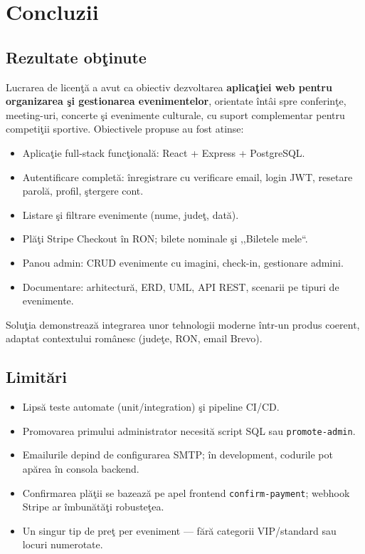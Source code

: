 \chapter{Concluzii}

\section{Rezultate ob\c tinute}

Lucrarea de licen\c t\u a a avut ca obiectiv dezvoltarea \textbf{aplica\c tiei web pentru organizarea \c si gestionarea evenimentelor}, orientate \^int\^ai spre conferin\c te, meeting-uri, concerte \c si evenimente culturale, cu suport complementar pentru competi\c tii sportive. Obiectivele propuse au fost atinse:

\begin{itemize}
	\item Aplica\c tie full-stack func\c tional\u a: React + Express + PostgreSQL.
	\item Autentificare complet\u a: \^inregistrare cu verificare email, login JWT, resetare parol\u a, profil, \c stergere cont.
	\item Listare \c si filtrare evenimente (nume, jude\c t, dat\u a).
	\item Pl\u a\c ti Stripe Checkout \^in RON; bilete nominale \c si ,,Biletele mele``.
	\item Panou admin: CRUD evenimente cu imagini, check-in, gestionare admini.
	\item Documentare: arhitectur\u a, ERD, UML, API REST, scenarii pe tipuri de evenimente.
\end{itemize}

Solu\c tia demonstreaz\u a integrarea unor tehnologii moderne \^intr-un produs coerent, adaptat contextului rom\^anesc (jude\c te, RON, email Brevo).


\section{Limit\u ari}

\begin{itemize}
	\item Lips\u a teste automate (unit/integration) \c si pipeline CI/CD.
	\item Promovarea primului administrator necesit\u a script SQL sau \texttt{promote-admin}.
	\item Emailurile depind de configurarea SMTP; \^in development, codurile pot ap\u area \^in consola backend.
	\item Confirmarea pl\u a\c tii se bazeaz\u a pe apel frontend \texttt{confirm-payment}; webhook Stripe ar \^imbun\u at\u a\c ti robuste\c tea.
	\item Un singur tip de pre\c t per eveniment — f\u ar\u a categorii VIP/standard sau locuri numerotate.
\end{itemize}

